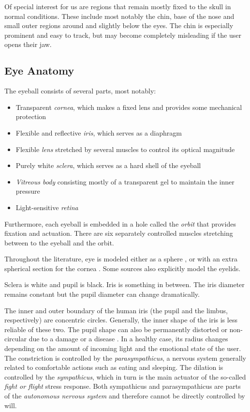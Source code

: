 Of special interest for us are regions that remain mostly fixed to the skull in normal conditions.
These include most notably the chin, base of the nose and small outer regions around and slightly below the eyes.
The chin is especially prominent and easy to track, but may become completely misleading if the user opens their jaw.
\todo{\dots}


\subsection{Eye Anatomy}
\label{s.eyeanatomy}

The eyeball consists of several parts, most notably:
\begin{itemize}
\item Transparent \textit{cornea}, which makes a fixed lens and provides some mechanical protection
\item Flexible and reflective \textit{iris}, which serves as a diaphragm
\item Flexible \textit{lens} stretched by several muscles to control its optical magnitude
\item Purely white \textit{sclera}, which serves as a hard shell of the eyeball
\item \textit{Vitreous body} consisting mostly of a transparent gel to maintain the inner pressure
\item Light-sensitive \textit{retina}
\end{itemize}

Furthermore, each eyeball is embedded in a hole called the \textit{orbit} that provides fixation and actuation.
There are six separately controlled muscles stretching between to the eyeball and the orbit.

Throughout the literature, eye is modeled either as a sphere \cite{zhang13}, or with an extra spherical section for the cornea \cite{villanueva08}.
Some sources also explicitly model the eyelids.

Sclera is white and pupil is black.
Iris is something in between.
The iris diameter remains constant but the pupil diameter can change dramatically.

The inner and outer boundary of the human iris (the pupil and the limbus, respectively) are concentric circles.
Generally, the inner shape of the iris is less reliable of these two.
The pupil shape can also be permanently distorted or non-circular due to a damage or a disease \cite{bowyer16}.
In a healthy case, its radius changes depending on the amount of incoming light and the emotional state of the user.
The constriction is controlled by the \textit{parasympathicus}, a nervous system generally related to comfortable actions such as eating and sleeping.
The dilation is controlled by the \textit{sympathicus}, which in turn is the main actuator of the so-called \textit{fight or flight} stress response.
Both sympathicus and parasympathicus are parts of the \textit{autonomous nervous system} and therefore cannot be directly controlled by will.

